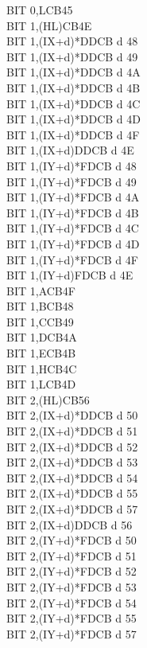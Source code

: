 \documentclass[oneside,a4paper]{book}
\begin{document}
\begin{multicols}{3}
{\begin{tabbing}
BIT 0,L\>CB45\\
BIT 1,(HL)\>CB4E\\
BIT 1,(IX+d)*\>DDCB d 48\\
BIT 1,(IX+d)*\>DDCB d 49\\
BIT 1,(IX+d)*\>DDCB d 4A\\
BIT 1,(IX+d)*\>DDCB d 4B\\
BIT 1,(IX+d)*\>DDCB d 4C\\
BIT 1,(IX+d)*\>DDCB d 4D\\
BIT 1,(IX+d)*\>DDCB d 4F\\
BIT 1,(IX+d)\>DDCB d 4E\\
BIT 1,(IY+d)*\>FDCB d 48\\
BIT 1,(IY+d)*\>FDCB d 49\\
BIT 1,(IY+d)*\>FDCB d 4A\\
BIT 1,(IY+d)*\>FDCB d 4B\\
BIT 1,(IY+d)*\>FDCB d 4C\\
BIT 1,(IY+d)*\>FDCB d 4D\\
BIT 1,(IY+d)*\>FDCB d 4F\\
BIT 1,(IY+d)\>FDCB d 4E\\
BIT 1,A\>CB4F\\
BIT 1,B\>CB48\\
BIT 1,C\>CB49\\
BIT 1,D\>CB4A\\
BIT 1,E\>CB4B\\
BIT 1,H\>CB4C\\
BIT 1,L\>CB4D\\
BIT 2,(HL)\>CB56\\
BIT 2,(IX+d)*\>DDCB d 50\\
BIT 2,(IX+d)*\>DDCB d 51\\
BIT 2,(IX+d)*\>DDCB d 52\\
BIT 2,(IX+d)*\>DDCB d 53\\
BIT 2,(IX+d)*\>DDCB d 54\\
BIT 2,(IX+d)*\>DDCB d 55\\
BIT 2,(IX+d)*\>DDCB d 57\\
BIT 2,(IX+d)\>DDCB d 56\\
BIT 2,(IY+d)*\>FDCB d 50\\
BIT 2,(IY+d)*\>FDCB d 51\\
BIT 2,(IY+d)*\>FDCB d 52\\
BIT 2,(IY+d)*\>FDCB d 53\\
BIT 2,(IY+d)*\>FDCB d 54\\
BIT 2,(IY+d)*\>FDCB d 55\\
BIT 2,(IY+d)*\>FDCB d 57\\

\end{tabbing}}
\end{multicols}
\end{document}
